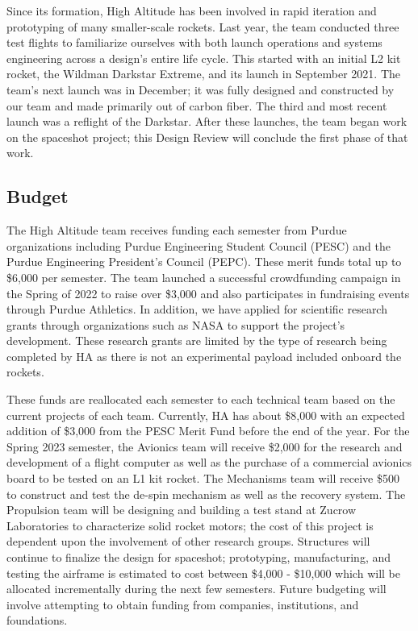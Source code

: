 Since its formation, High Altitude has been involved in rapid iteration and prototyping of many smaller-scale rockets. Last year, the team conducted three test flights to familiarize ourselves with both launch operations and systems engineering across a design's entire life cycle. This started with an initial L2 kit rocket, the Wildman Darkstar Extreme, and its launch in September 2021. The team’s next launch was in December; it was fully designed and constructed by our team and made primarily out of carbon fiber. The third and most recent launch was a reflight of the Darkstar. After these launches, the team began work on the spaceshot project; this Design Review will conclude the first phase of that work.

\subsection{Budget}
The High Altitude team receives funding each semester from Purdue organizations including Purdue Engineering Student Council (PESC) and the Purdue Engineering President’s Council (PEPC).  These merit funds total up to \$6,000 per semester.  The team launched a successful crowdfunding campaign in the Spring of 2022 to raise over \$3,000 and also participates in fundraising events through Purdue Athletics.  In addition, we have applied for scientific research grants through organizations such as NASA to support the project’s development.  These research grants are limited by the type of research being completed by HA as there is not an experimental payload included onboard the rockets.

These funds are reallocated each semester to each technical team based on the current projects of each team.  Currently, HA has about \$8,000 with an expected addition of \$3,000 from the PESC Merit Fund before the end of the year.  For the Spring 2023 semester, the Avionics team will receive \$2,000 for the research and development of a flight computer as well as the purchase of a commercial avionics board to be tested on an L1 kit rocket.  The Mechanisms team will receive \$500 to construct and test the de-spin mechanism as well as the recovery system.  The Propulsion team will be designing and building a test stand at Zucrow Laboratories to characterize solid rocket motors; the cost of this project is dependent upon the involvement of other research groups.  Structures will continue to finalize the design for spaceshot; prototyping, manufacturing, and testing the airframe is estimated to cost between \$4,000 - \$10,000 which will be allocated  incrementally during the next few semesters.  Future budgeting will involve attempting to obtain funding from companies, institutions, and foundations.
